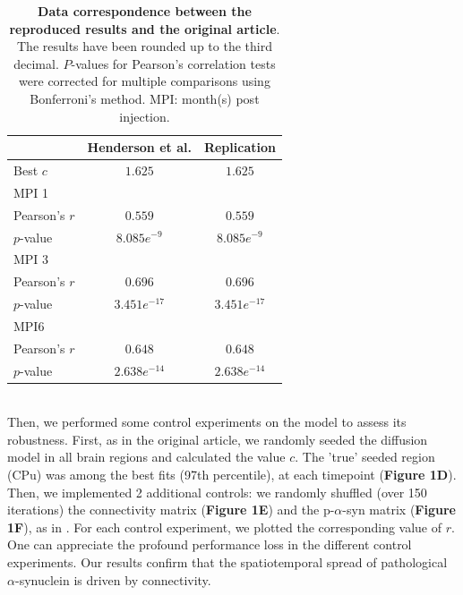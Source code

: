 \begin{table}[h]
  \begin{center}
    \centering
    
    \begin{tabular}{|l|c|c|} %
      \hline
      
      &\textbf{Henderson et al.} & \textbf{Replication} \hspace{1cm}\\

      \hline
      Best  $c$  & $1.625$ & $1.625$ \\
      MPI 1 & &\\
            \hspace{1cm} Pearson's $r$ & $0.559$ & $0.559$\\
            \hspace{1cm} $p$-value & $8.085e^{-9}$ & $8.085e^{-9}$ \\ 
      MPI 3& &\\
            \hspace{1cm} Pearson's $r$ & $0.696$ & $0.696$ \\
            \hspace{1cm} $p$-value & $3.451e^{-17}$ &  $3.451e^{-17}$ \\ 
       
      MPI6& &\\
            \hspace{1cm} Pearson's $r$ & $0.648$ & $0.648$ \\
            \hspace{1cm} $p$-value & $2.638e^{-14}$& $2.638e^{-14}$ \\ 
      \hline
      
    \end{tabular}
    \caption{\textbf{Data correspondence between the reproduced results and the original article}. The results have been rounded up to the third decimal. $P$-values for Pearson's correlation tests were corrected for multiple comparisons using Bonferroni's method. MPI: month(s) post injection.}
  \end{center}
\end{table}

\\
Then, we performed some control experiments on the model to assess its robustness. First, as in the original article, we randomly seeded the diffusion model in all brain regions and calculated the value $c$. The 'true' seeded region (CPu) was among the best fits (97th percentile), at each timepoint (\textbf{Figure 1D}). Then, we implemented 2 additional controls: we randomly shuffled (over 150 iterations) the connectivity matrix (\textbf{Figure 1E}) and the p-$\alpha$-syn matrix (\textbf{Figure 1F}), as in \cite{Pandya_2017}. For each control experiment, we plotted the corresponding value of $r$. One can appreciate the profound performance loss in the different control experiments. Our results confirm that the spatiotemporal spread of pathological $\alpha$-synuclein is driven by connectivity.

